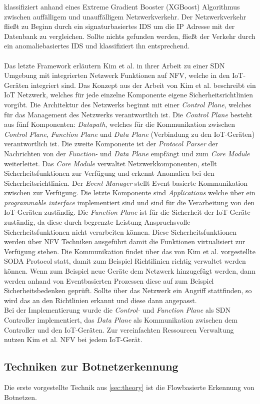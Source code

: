 klassifiziert anhand eines Extreme Gradient Booster (XGBoost) Algorithmus \cite{DBLP:journals/corr/ChenG16} zwischen auffälligem und unauffälligem Netzwerkverkehr. Der Netzwerkverkehr fließt zu Beginn 
durch ein signaturbasiertes IDS um die IP Adresse mit der Datenbank zu vergleichen. Sollte nichts gefunden werden, fließt der Verkehr durch ein anomaliebasiertes IDS und klassifiziert ihn entsprechend.
\\ \\ Das letzte Framework erläutern Kim et al. \cite{DBLP:journals/cn/KimNPSS19} in ihrer Arbeit zu einer SDN Umgebung mit integrierten Netzwerk Funktionen auf NFV, welche in den IoT-Geräten integriert
sind. Das Konzept aus der Arbeit von Kim et al. beschreibt ein IoT Netzwerk, welches für jede einzelne Komponente eigene Sicherheitsrichtlinien vorgibt. Die Architektur des Netzwerks beginnt mit einer
\textit{Control Plane}, welches für das Management des Netzwerks verantwortlich ist. Die \textit{Control Plane} besteht aus fünf Komponenten: \textit{Datapath}, welches für die Kommunikation zwischen 
\textit{Control Plane}, \textit{Function Plane} und \textit{Data Plane} (Verbindung zu den IoT-Geräten) verantwortlich ist. Die zweite Komponente ist der \textit{Protocol
Parser} der Nachrichten von der \textit{Function-} und \textit{Data Plane} empfängt und zum \textit{Core Module} weiterleitet. Das \textit{Core Module} verwaltet Netzwerkkomponenten, stellt 
Sicherheitsfunktionen zur Verfügung und erkennt Anomalien bei den Sicherheitsrichtlinien. Der \textit{Event Manager} stellt Event basierte Kommunikation zwischen zur Verfügung. Die letzte Komponente sind 
\textit{Applications} welche über ein \textit{programmable interface} implementiert sind und sind für die Verarbeitung von den IoT-Geräten zuständig. Die \textit{Function Plane} ist für die Sicherheit der 
IoT-Geräte zuständig, da diese durch begrenzte Leistung Anspruchsvolle Sicherheitsfunktionen nicht verarbeiten können. Diese Sicherheitsfunktionen werden über NFV Techniken ausgeführt damit die Funktionen 
virtualisiert zur Verfügung stehen. Die Kommunikation findet über das von Kim et al. vorgestellte SODA Protocol statt, damit zum Beispiel Richtilinien richtig verwaltet werden können. Wenn zum Beispiel neue 
Geräte dem Netzwerk hinzugefügt werden, dann werden anhand von Eventbasierten Prozessen diese auf zum Beispiel Sicherheitsbedenken geprüft. Sollte über das Netzwerk ein Angriff stattfinden, so wird das an 
den Richtlinien erkannt und diese dann angepasst. \\ Bei der Implementierung wurde die \textit{Control-} und \textit{Function Plane} als SDN Controller implementiert, das \textit{Data Plane} als Kommunikation 
zwischen dem Controller und den IoT-Geräten. Zur vereinfachten Ressourcen Verwaltung nutzen Kim et al. NFV bei jedem IoT-Gerät.
\subsection*{Techniken zur Botnetzerkennung}
Die erste vorgestellte Technik aus \ref{sec:theory} ist die Flowbasierte Erkennung von Botnetzen. 